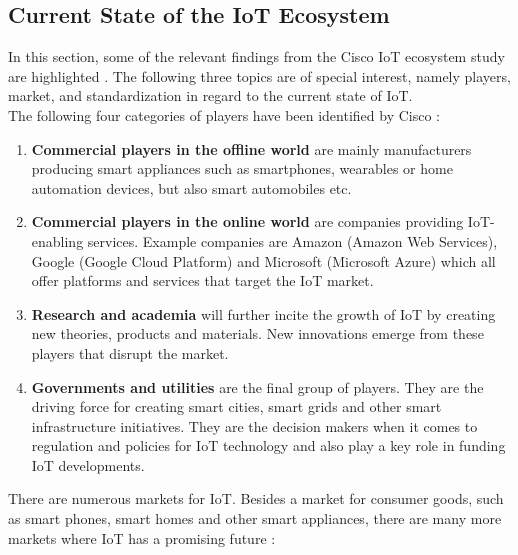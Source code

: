 	\subsection{Current State of the IoT Ecosystem}
	\vspace{-1em}
		In this section, some of the relevant findings from the Cisco IoT ecosystem study are highlighted \cite{cisco}. The following three topics are of special interest, namely players, market, and standardization in regard to the current state of IoT.\\
		The following four categories of players have been identified by Cisco \cite{cisco}:
		\vspace{-1em}
		\begin{enumerate}
			\item \textbf{Commercial players in the offline world} are mainly manufacturers producing smart appliances such as smartphones, wearables or home automation devices, but also smart automobiles etc.

			\item \textbf{Commercial players in the online world} are companies providing IoT-enabling services. Example companies are Amazon (Amazon Web Services), Google (Google Cloud Platform) and Microsoft (Microsoft Azure) which all offer platforms and services that target the IoT market.

			\item \textbf{Research and academia} will further incite the growth of IoT by creating new theories, products and materials. New innovations emerge from these players that disrupt the market.

			\item \textbf{Governments and utilities} are the final group of players. They are the driving force for creating smart cities, smart grids and other smart infrastructure initiatives. They are the decision makers when it comes to regulation and policies for IoT technology and also play a key role in funding IoT developments.
		\end{enumerate}
		\vspace{-1em}
		There are numerous markets for IoT. Besides a market for consumer goods, such as smart phones, smart homes and other smart appliances, there are many more markets where IoT has a promising future \cite{cisco}:
		\vspace{-1em}
